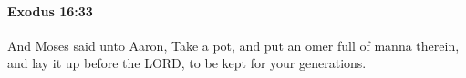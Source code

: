 
		\paragraph{Exodus 16:33} %
			\label{EXODUS-16-33}

			And Moses said unto Aaron, Take a pot, and put an omer full of manna therein, and lay it up before the LORD, to be kept for your generations.


